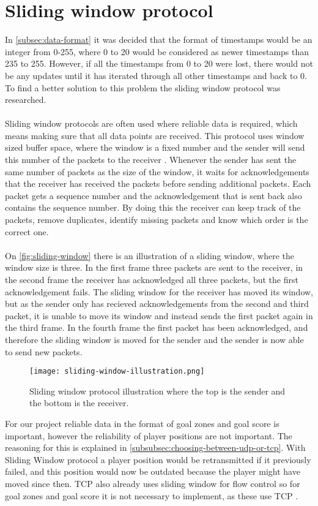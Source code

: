 \section{Sliding window protocol}
In \autoref{subsec:data-format} it was decided that the format of timestamps would be an integer from 0-255, where 0 to 20 would be considered as newer timestamps than 235 to 255.
However, if all the timestamps from 0 to 20 were lost, there would not be any updates until it has iterated through all other timestamps and back to 0.
To find a better solution to this problem the sliding window protocol was researched.
\\\\
Sliding window protocols are often used where reliable data is required, which means making sure that all data points are received.
This protocol uses window sized buffer space, where the window is a fixed number and the sender will send this number of the packets to the receiver \cite{design-and-validation-of-computer-protocols}.
Whenever the sender has sent the same number of packets as the size of the window, it waits for acknowledgements that the receiver has received the packets before sending additional packets.
Each packet gets a sequence number and the acknowledgement that is sent back also contains the sequence number.
By doing this the receiver can keep track of the packets, remove duplicates, identify missing packets and know which order is the correct one.
\\\\
On \autoref{fig:sliding-window} there is an illustration of a sliding window, where the window size is three.
In the first frame three packets are sent to the receiver, in the second frame the receiver has acknowledged all three packets, but the first acknowledgement fails.
The sliding window for the receiver has moved its window, but as the sender only has recieved acknowledgements from the second and third packet, it is unable to move its window and instead sends the first packet again in the third frame.
In the fourth frame the first packet has been acknowledged, and therefore the sliding window is moved for the sender and the sender is now able to send new packets.
\begin{figure}[H]
    \centering
    \texttt{[image: sliding-window-illustration.png]}
    \caption{Sliding window protocol illustration where the top is the sender and the bottom is the receiver.}
    \label{fig:sliding-window}
\end{figure}
\noindent
For our project reliable data in the format of goal zones and goal score is important, however the reliability of player positions are not important.
The reasoning for this is explained in \autoref{subsubsec:choosing-between-udp-or-tcp}.
With Sliding Window protocol a player position would be retransmitted if it previously failed, and this position would now be outdated because the player might have moved since then.
TCP also already uses sliding window for flow control so for goal zones and goal score it is not necessary to implement, as these use TCP \cite{ibm:sliding-window}.
